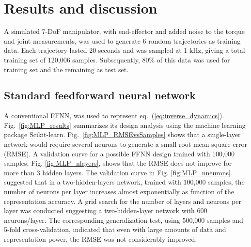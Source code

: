 \section{Results and discussion}\label{sec:results}
A simulated 7-DoF manipulator, with end-effector and added noise to the torque and joint measurements, was used to generate 6 random trajectories as training data. Each trajectory lasted 20 seconds and was sampled at 1 kHz, giving a total training set of 120,006 samples. Subsequently, 80\% of this data was used for training set and the remaining as test set.
\subsection{Standard feedforward neural network}
A conventional FFNN, was used to represent eq.~(\ref{eq:inverse_dynamics}). Fig.~\ref{fig:MLP_results} summarizes its design analysis
using the machine learning package Scikit-learn. Fig.~\ref{fig:MLP_RMSEvsSamples} shows that a single-layer network would require several neurons to generate a small root mean square error (RMSE). A validation curve for a possible FFNN design trained with 100,000 samples,
Fig. \ref{fig:MLP_nlayers}, shows  that the RMSE does not improve for more than 3 hidden layers. 
The validation curve in Fig. \ref{fig:MLP_nneurons} suggested that in a two-hidden-layers network, trained with 100,000 samples, the number of neurons per layer increases almost exponentially as function of the representation accuracy.
A grid search for the number of layers and neurons per layer was conducted suggesting a two-hidden-layer network with 600 neurons/layer. The corresponding generalization test, using 500,000 samples and 5-fold cross-validation, indicated that even with large amounts of data and representation power, the RMSE was not considerably improved.
